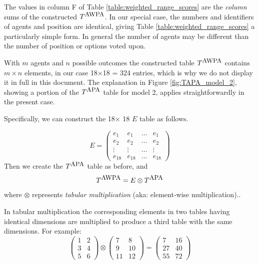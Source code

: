\begin{enumerate}
The values in column F of Table \ref{table:weighted_range_scores} are  the \emph{column} sums of the constructed $T^{\mbox{\small AWPA}}$.  In our special case, the numbers and identifiers of agents and   {position} are identical, giving Table \ref{table:weighted_range_scores} a particularly simple form. In general the number of agents may be different than the number of   {position} or options voted upon.

 
With $m$ agents and $n$ possible outcomes the constructed table $T^{\mbox{\small AWPA}}$  contains $m\times n$ elements, in our case 18$\times$18 = 324 entries, which is why we do not display it in full in this document. The explanation in Figure \ref{fig:TAPA_model_2}, showing a portion of the $T^{\mbox{\small APA}}$  table for model 2, applies straightforwardly in the present case.

Specifically, we can construct the 18$\times$ 18 $E$ table as follows.

\begin{equation}
E = \left(\begin{array}{cccc}
e_1 & e_1 & \ldots & e_{1} \\
e_2 & e_2 & \ldots & e_2 \\
\vdots & \vdots & \ldots & \vdots \\
e_{18} & e_{18} & \ldots & e_{18} 
\end{array}
\right)
\end{equation}
Then we create the $T^{\mbox{\small APA}}$ table as before, and 
\begin{equation}
T^{\mbox{\small AWPA}} = E \otimes T^{\mbox{\small APA}}
\end{equation}
where $\otimes$ represents \emph{tabular multiplication} (aka: element-wise multiplication)..

In tabular multiplication the corresponding elements in two tables having identical dimensions are multiplied to produce a third table with the same dimensions. For example:
\begin{equation}
\left(\begin{array}{cc}
1 & 2 \\
3 & 4 \\
5 & 6
\end{array}
\right) \otimes 
\left(\begin{array}{cc}
7 & 8 \\
9 & 10 \\
11 & 12
\end{array}
\right) =
\left(\begin{array}{cc}
7 & 16 \\
27 & 40 \\
55 & 72
\end{array}
\right)
\end{equation}


\end{enumerate}
